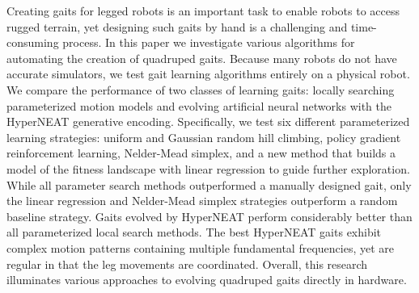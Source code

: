 Creating gaits for legged robots is an important task to enable robots to access rugged terrain, yet designing such gaits by hand is a challenging and time-consuming process. In this paper we investigate various algorithms for automating the creation of quadruped gaits. Because many robots do not have accurate simulators, we test gait learning algorithms entirely on a physical robot.  
	We compare the performance of two classes of learning gaits:
locally searching parameterized motion models and evolving artificial neural networks with the HyperNEAT generative encoding. Specifically, we test six different parameterized learning strategies: uniform and Gaussian random hill climbing, policy gradient
reinforcement learning, Nelder-Mead simplex, and a new method that
builds a model of the fitness landscape with linear regression to guide further exploration.
While all parameter search methods outperformed a manually designed
gait, only the linear regression and Nelder-Mead simplex strategies
outperform a random baseline strategy. Gaits evolved by HyperNEAT perform considerably better than all
parameterized local search methods.  The best HyperNEAT gaits exhibit
complex motion patterns containing multiple fundamental frequencies,
yet are regular in that the leg movements are coordinated. Overall, this research illuminates various approaches to evolving quadruped gaits directly in hardware.



